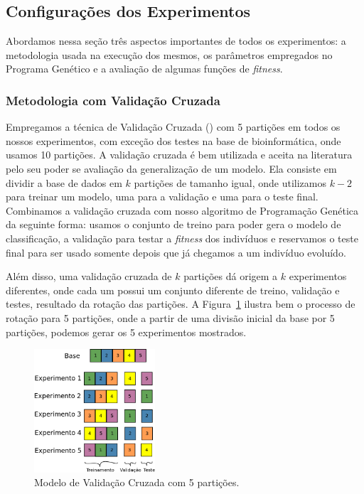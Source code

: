 \subsection{Configurações dos Experimentos}
\label{subsec::config}

Abordamos nessa seção três aspectos importantes de todos os experimentos: a metodologia usada na execução dos mesmos, os parâmetros empregados no Programa Genético e 
a avaliação de algumas funções de \textit{fitness}.

\subsubsection{Metodologia com Validação Cruzada}
\label{subsubsec::cv}

Empregamos a técnica de Validação Cruzada (\cite{Refaeilzadeh00}) com 5 partições em todos os nossos experimentos, com exceção dos testes na base de bioinformática, onde usamos 10 partições.
A validação cruzada é bem utilizada e aceita na literatura pelo seu poder se avaliação da generalização de um modelo. Ela consiste em dividir a base de dados em $k$ partições de tamanho igual, onde utilizamos $k-2$ para treinar um modelo, uma para a validação e uma para o teste final. 
Combinamos a validação cruzada com nosso algoritmo de Programação Genética da seguinte forma: usamos o conjunto de treino para poder gera o modelo de classificação, a validação para testar a \textit{fitness} dos indivíduos e reservamos o teste final para ser usado somente depois que já chegamos a um indivíduo evoluído. 

Além disso, uma validação cruzada de $k$ partições dá origem a $k$ experimentos diferentes, onde cada um possui um conjunto diferente de treino, validação e testes, resultado da rotação das partições. A Figura~\ref{fig::cv} ilustra bem o processo de rotação para 5 partições, onde a partir de uma divisão inicial da base por 5 partições, podemos gerar os 5 experimentos mostrados.

\begin{figure}[h!]
  \centering
  \includegraphics[width=0.40\textwidth]{figures/cv.png}
 \caption{Modelo de Validação Cruzada com 5 partições.}
\label{fig::cv}
\end{figure}


